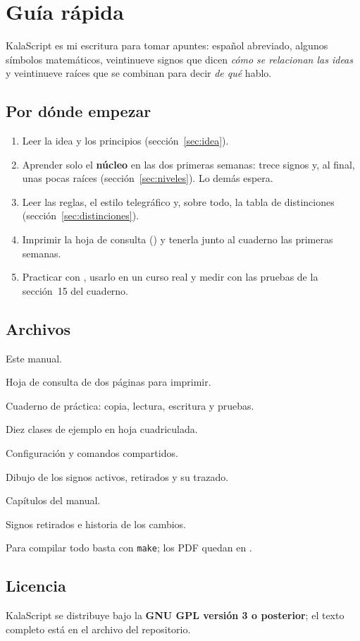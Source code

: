 \section*{Guía rápida}
KalaScript es mi escritura para tomar apuntes: español abreviado, algunos
símbolos matemáticos, veintinueve signos que dicen \emph{cómo se relacionan
las ideas} y veintinueve raíces que se combinan para decir \emph{de qué} hablo.

\subsection*{Por dónde empezar}
\begin{enumerate}
\item Leer la idea y los principios (sección~\ref{sec:idea}).
\item Aprender solo el \textbf{núcleo} en las dos primeras semanas: trece signos
 y, al final, unas pocas raíces (sección~\ref{sec:niveles}). Lo demás espera.
\item Leer las reglas, el estilo telegráfico y, sobre todo, la tabla de
 distinciones (sección~\ref{sec:distinciones}).
\item Imprimir la hoja de consulta () y tenerla junto
 al cuaderno las primeras semanas.
\item Practicar con , usarlo en un curso real y
 medir con las pruebas de la sección~15 del cuaderno.
\end{enumerate}

\subsection*{Archivos}
\begin{description}[style=standard,itemsep=2pt]
\item[\texttt{KalaScript.tex}] Este manual.
\item[\texttt{atlas.tex}] Hoja de consulta de dos páginas para imprimir.
\item[\texttt{practica.tex}] Cuaderno de práctica: copia, lectura, escritura y pruebas.
\item[\texttt{apuntes.tex}] Diez clases de ejemplo en hoja cuadriculada.
\item[\texttt{preambulo.tex}] Configuración y comandos compartidos.
\item[\texttt{simbolos/}] Dibujo de los signos activos, retirados y su trazado.
\item[\texttt{docs/}] Capítulos del manual.
\item[\texttt{anexos/}] Signos retirados e historia de los cambios.
\end{description}
Para compilar todo basta con \texttt{make}; los PDF quedan en .

\subsection*{Licencia}
KalaScript se distribuye bajo la \textbf{GNU GPL versión 3 o posterior};
el texto completo está en el archivo  del repositorio.
